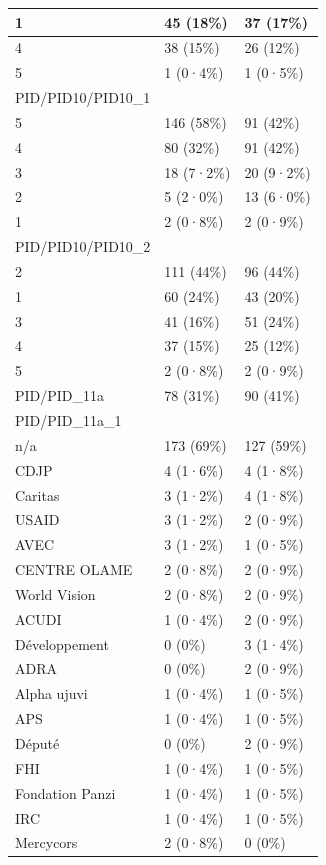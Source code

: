 \documentclass[
]{book}
\begin{document}
\begin{tabular}{l|l|l}
\hline
1 & 45 (18\%) & 37 (17\%)\\
\hline
4 & 38 (15\%) & 26 (12\%)\\
\hline
5 & 1 (0·4\%) & 1 (0·5\%)\\
\hline
PID/PID10/PID10\_1 &  & \\
\hline
5 & 146 (58\%) & 91 (42\%)\\
\hline
4 & 80 (32\%) & 91 (42\%)\\
\hline
3 & 18 (7·2\%) & 20 (9·2\%)\\
\hline
2 & 5 (2·0\%) & 13 (6·0\%)\\
\hline
1 & 2 (0·8\%) & 2 (0·9\%)\\
\hline
PID/PID10/PID10\_2 &  & \\
\hline
2 & 111 (44\%) & 96 (44\%)\\
\hline
1 & 60 (24\%) & 43 (20\%)\\
\hline
3 & 41 (16\%) & 51 (24\%)\\
\hline
4 & 37 (15\%) & 25 (12\%)\\
\hline
5 & 2 (0·8\%) & 2 (0·9\%)\\
\hline
PID/PID\_11a & 78 (31\%) & 90 (41\%)\\
\hline
PID/PID\_11a\_1 &  & \\
\hline
n/a & 173 (69\%) & 127 (59\%)\\
\hline
CDJP & 4 (1·6\%) & 4 (1·8\%)\\
\hline
Caritas & 3 (1·2\%) & 4 (1·8\%)\\
\hline
USAID & 3 (1·2\%) & 2 (0·9\%)\\
\hline
AVEC & 3 (1·2\%) & 1 (0·5\%)\\
\hline
CENTRE OLAME & 2 (0·8\%) & 2 (0·9\%)\\
\hline
World Vision & 2 (0·8\%) & 2 (0·9\%)\\
\hline
ACUDI & 1 (0·4\%) & 2 (0·9\%)\\
\hline
Développement & 0 (0\%) & 3 (1·4\%)\\
\hline
ADRA & 0 (0\%) & 2 (0·9\%)\\
\hline
Alpha ujuvi & 1 (0·4\%) & 1 (0·5\%)\\
\hline
APS & 1 (0·4\%) & 1 (0·5\%)\\
\hline
Député & 0 (0\%) & 2 (0·9\%)\\
\hline
FHI & 1 (0·4\%) & 1 (0·5\%)\\
\hline
Fondation Panzi & 1 (0·4\%) & 1 (0·5\%)\\
\hline
IRC & 1 (0·4\%) & 1 (0·5\%)\\
\hline
Mercycors & 2 (0·8\%) & 0 (0\%)\\

\end{tabular}
\end{document}
